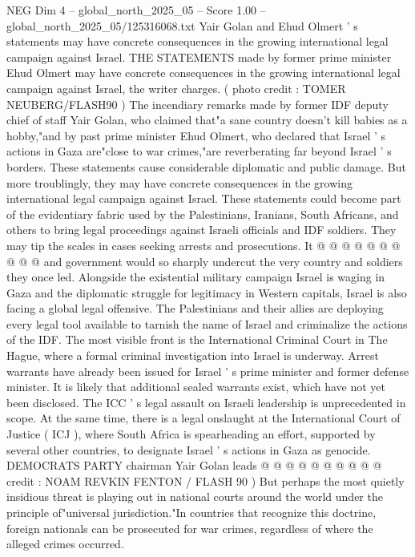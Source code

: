 \begin{textsample}{NEG Dim 4 – global\_north\_2025\_05 – Score 1.00 – global\_north\_2025\_05/125316068.txt}  \label{ex:f4_neg_244}
Yair Golan and Ehud Olmert ' s statements may have concrete consequences in the growing international legal campaign against Israel.
THE STATEMENTS made by former prime minister Ehud Olmert may have concrete consequences in the growing international legal campaign against Israel, the writer charges. ( photo credit : TOMER NEUBERG/FLASH90 ) The incendiary remarks made by former IDF deputy chief of staff Yair Golan, who claimed that"a sane country doesn't kill babies as a hobby,"and by past prime minister Ehud Olmert, who declared that Israel ' s actions in Gaza are"close to war crimes,"are reverberating far beyond Israel ' s borders.
These statements cause considerable diplomatic and public damage.
But more troublingly, they may have concrete consequences in the growing international legal campaign against Israel.
These statements could become part of the evidentiary fabric used by the Palestinians, Iranians, South Africans, and others to bring legal proceedings against Israeli officials and IDF soldiers.
They may tip the scales in cases seeking arrests and prosecutions.
It @ @ @ @ @ @ @ @ @ @ and government would so sharply undercut the very country and soldiers they once led.
Alongside the existential military campaign Israel is waging in Gaza and the diplomatic struggle for legitimacy in Western capitals, Israel is also facing a global legal offensive.
The Palestinians and their allies are deploying every legal tool available to tarnish the name of Israel and criminalize the actions of the IDF.
The most visible front is the International Criminal Court in The Hague, where a formal criminal investigation into Israel is underway.
Arrest warrants have already been issued for Israel ' s prime minister and former defense minister.
It is likely that additional sealed warrants exist, which have not yet been disclosed.
The ICC ' s legal assault on Israeli leadership is unprecedented in scope.
At the same time, there is a legal onslaught at the International Court of Justice ( ICJ ), where South Africa is spearheading an effort, supported by several other countries, to designate Israel ' s actions in Gaza as genocide.
DEMOCRATS PARTY chairman Yair Golan leads @ @ @ @ @ @ @ @ @ @ credit : NOAM REVKIN FENTON / FLASH 90 ) But perhaps the most quietly insidious threat is playing out in national courts around the world under the principle of"universal jurisdiction."In countries that recognize this doctrine, foreign nationals can be prosecuted for war crimes, regardless of where the alleged crimes occurred.

\end{textsample}
